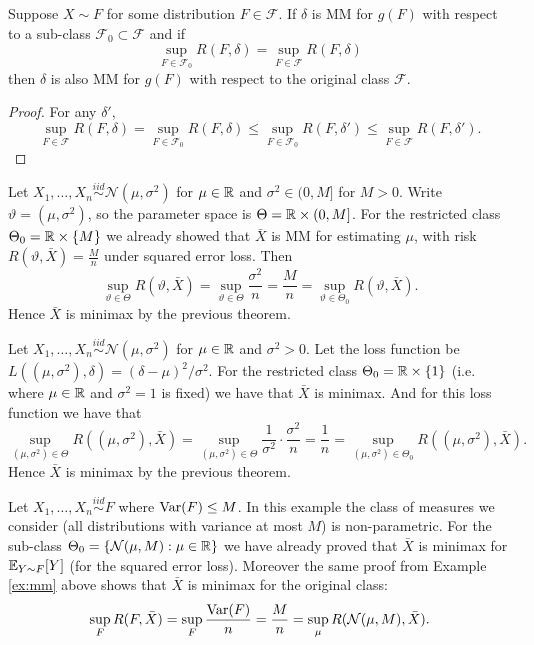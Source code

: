 \begin{theorem}
	Suppose $X \sim F$ for some distribution $F \in \mathcal F$. If $\delta$ is MM for $g(F)$ with respect to a sub-class $\mathcal F_0 \subset \mathcal F$ and if \[
		\sup_{F \in \mathcal{F}_0} R(F, \delta) = \sup_{F \in \mathcal{F}} R(F, \delta)
	\] then $\delta$ is also MM for $g(F)$ with respect to the original class $\mathcal F$.
\end{theorem}
\begin{proof}
	For any $\delta'$, \[
		\sup_{F \in \mathcal{F}} R(F, \delta) = \sup_{F \in \mathcal{F}_0} R(F, \delta) \leq \sup_{F \in \mathcal{F}_0} R(F, \delta') \leq \sup_{F \in \mathcal{F}} R(F, \delta').
	\]
\end{proof}

\begin{example} \label{ex:mm}
	Let $X_1, \dots, X_n \overset{iid}{\sim} \mathcal{N}(\mu, \sigma^2)$ for $\mu \in \mathbb{R}$ and $\sigma^2 \in (0, M]$ for $M > 0$. Write $\vartheta=(\mu,\sigma^2)$, so the parameter space is $\Theta = \mathbb{R} \times (0, M]$. For the restricted class $\Theta_0 = \mathbb{R} \times \{M\}$ we already showed that $\bar X$ is MM for estimating $\mu$, with risk $R(\vartheta, \bar X) = \frac{M}{n}$ under squared error loss. Then \[
		\sup_{\vartheta\in\Theta} R(\vartheta, \bar X) = \sup_{\vartheta\in\Theta} \frac{\sigma^2}{n} = \frac{M}{n} = \sup_{\vartheta\in\Theta_0} R(\vartheta, \bar X).
	\] Hence $\bar X$ is minimax by the previous theorem.
\end{example}

\begin{example}
	Let $X_1, \dots, X_n \overset{iid}{\sim} \mathcal{N}(\mu, \sigma^2)$ for $\mu \in \mathbb{R}$ and $\sigma^2 > 0$. Let the loss function be $L((\mu, \sigma^2), \delta) = (\delta - \mu)^2 / \sigma^2$. For the restricted class $\Theta_0 = \mathbb{R} \times \{1\}$ (i.e. where $\mu \in \mathbb{R}$ and $\sigma^2 = 1$ is fixed) we have that $\bar X$ is minimax. And for this loss function we have that \[
			\sup_{(\mu,\sigma^2)\in\Theta} R((\mu,\sigma^2), \bar X) = \sup_{(\mu,\sigma^2)\in\Theta} \frac{1}{\sigma^2} \cdot \frac{\sigma^2}{n} = \frac{1}{n} = \sup_{(\mu,\sigma^2)\in\Theta_0} R((\mu,\sigma^2), \bar X).
	\] Hence $\bar X$ is minimax by the previous theorem.
\end{example}

\begin{example}
	Let $X_1, \dots, X_n \overset{iid}{\sim} F$ where $\operatorname{Var}(F) \le M$. In this example the class of measures we consider (all distributions with variance at most $M$) is non-parametric. For the sub-class $\Theta_0 = \{\mathcal{N}(\mu, M) : \mu \in \mathbb{R} \}$ we have already proved that $\bar X$ is minimax for $\mathbb{E}_{Y \sim F}[Y]$ (for the squared error loss). Moreover the same proof from Example \ref{ex:mm} above shows that $\bar X$ is minimax for the original class: \[
	\sup_F R(F, \bar X) = \sup_F \frac{\operatorname{Var}(F)}{n} = \frac{M}{n} = \sup_{\mu} R(\mathcal{N}(\mu, M), \bar X).
	\]
\end{example}


